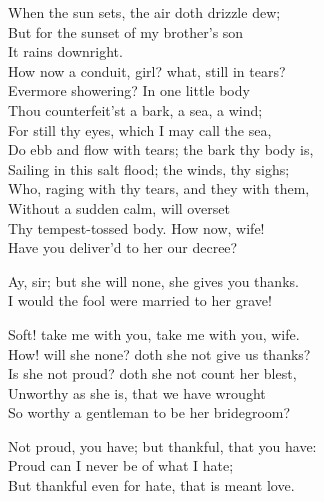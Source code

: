 \begin{speech}
When the sun sets, the air doth drizzle dew; \\
But for the sunset of my brother's son \\
It rains downright. \\
How now a conduit, girl? what, still in tears? \\
Evermore showering?   In one little body \\
Thou counterfeit'st a bark, a sea, a wind; \\
For still thy eyes, which I may call the sea, \\
Do ebb and flow with tears; the bark thy body is, \\
Sailing in this salt flood; the winds, thy sighs; \\
Who, raging with thy tears, and they with them, \\
Without a sudden calm, will overset \\
Thy tempest-tossed body. How now, wife! \\
Have you deliver'd to her our decree? \\
\end{speech}
\begin{speech}
Ay, sir; but she will none, she gives you thanks.
\\
I would the fool were married to her grave! \\
\end{speech}
\begin{speech}
Soft! take me with you, take me with you, wife. \\

How! will she none? doth she not give us thanks? \\
Is she not proud? doth she not count her blest, \\
Unworthy as she is, that we have wrought \\
So worthy a gentleman to be her bridegroom? \\
\end{speech}
\begin{speech}
Not proud, you have; but thankful, that you have:
\\
Proud can I never be of what I hate; \\
But thankful even for hate, that is meant love. \\
\end{speech}
